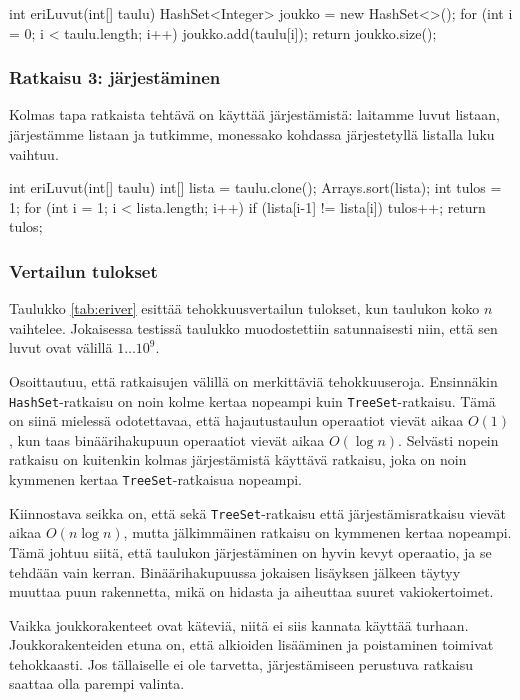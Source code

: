 \begin{code}
int eriLuvut(int[] taulu) {
    HashSet<Integer> joukko = new HashSet<>();
    for (int i = 0; i < taulu.length; i++) {
        joukko.add(taulu[i]);
    }
    return joukko.size();
}
\end{code}

\subsubsection{Ratkaisu 3: järjestäminen}

Kolmas tapa ratkaista tehtävä on käyttää järjestämistä:
laitamme luvut listaan, järjestämme listaan ja
tutkimme, monessako kohdassa järjestetyllä listalla
luku vaihtuu.

\begin{code}
int eriLuvut(int[] taulu) {
    int[] lista = taulu.clone();
    Arrays.sort(lista);
    int tulos = 1;
    for (int i = 1; i < lista.length; i++) {
        if (lista[i-1] != lista[i]) tulos++;
    }
    return tulos;
}
\end{code}

\subsubsection{Vertailun tulokset}

Taulukko \ref{tab:eriver} esittää tehokkuusvertailun tulokset,
kun taulukon koko $n$ vaihtelee.
Jokaisessa testissä taulukko muodostettiin satunnaisesti niin,
että sen luvut ovat välillä $1 \dots 10^9$.

Osoittautuu, että ratkaisujen välillä on merkittäviä tehokkuuseroja.
Ensinnäkin \texttt{HashSet}-ratkaisu on noin kolme kertaa
nopeampi kuin \texttt{TreeSet}-ratkaisu.
Tämä on siinä mielessä odotettavaa, että hajautustaulun
operaatiot vievät aikaa $O(1)$, kun taas binäärihakupuun
operaatiot vievät aikaa $O(\log n)$.
Selvästi nopein ratkaisu on kuitenkin kolmas järjestämistä
käyttävä ratkaisu, joka on noin kymmenen kertaa
\texttt{TreeSet}-ratkaisua nopeampi.

Kiinnostava seikka on, että sekä \texttt{TreeSet}-ratkaisu että
järjestämisratkaisu vievät aikaa $O(n \log n)$, mutta
jälkimmäinen ratkaisu on kymmenen kertaa nopeampi.
Tämä johtuu siitä, että taulukon järjestäminen on hyvin kevyt
operaatio, ja se tehdään vain kerran.
Binäärihakupuussa jokaisen lisäyksen jälkeen täytyy muuttaa
puun rakennetta, mikä on hidasta ja aiheuttaa suuret vakiokertoimet.

Vaikka joukkorakenteet ovat käteviä, niitä ei siis kannata
käyttää turhaan.
Joukkorakenteiden etuna on, että alkioiden lisääminen ja poistaminen
toimivat tehokkaasti.
Jos tällaiselle ei ole tarvetta, järjestämiseen perustuva ratkaisu
saattaa olla parempi valinta.

